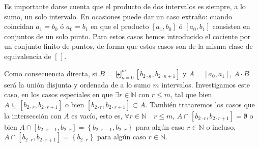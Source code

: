 \documentclass[final,12pt,a4paper,twoside,fleqn]{extbook}
\newcommand{\set}[1]{\ensuremath{\left\lbrace{#1}\right\rbrace}}
\newcommand{\setN}{\ensuremath{\mathds{N}}}
\theoremstyle{definition}
\theoremstyle{remark}
\begin{document}
	Es importante darse cuenta que el producto de dos intervalos es siempre,
a lo sumo, un solo intervalo. En ocasiones puede dar un caso extraño: cuando
coincidan \(a_1 = b_0\) ó \(a_0 = b_1\) en que el producto
\(\left[a_1,b_0\right]\) ó \(\left[a_0,b_1\right]\) consisten en conjuntos de
un solo punto. Para estos casos hemos introducido el cociente por un conjunto
finito de puntos, de forma que estos casos son de la misma clase de
equivalencia de \(\left[\,\right]\).



	Como consecuencia directa, si \(B={\biguplus}_{\kappa=0}^{m}
\left[b_{2\cdot\kappa},b_{2\cdot\kappa+1}\right]\) y
\(A=\left[a_0,a_1\right]\), \(A\cdot B\) será la unión disjunta y ordenada de
a lo sumo \(m\) intervalos. Investigamos este caso, en los casos especiales
en que \(\exists r \in \setN\) con \(r \leq m\), tal que bien \(A \subseteq
\left[b_{2\cdot r},b_{2\cdot r+1}\right]\) o bien  \(\left[b_{2\cdot
r},b_{2\cdot r+1}\right] \subset A\). También trataremos los casos que la
intersección con \(A\) es vacío, esto es, \(\forall r \in \setN\quad r \leq
m\), \(A \cap \left[b_{2\cdot r},b_{2\cdot r+1}\right] = \emptyset\) o bien
\(A \cap \left[b_{2\cdot r-1},b_{2\cdot r}\right] = \set{b_{2\cdot
r-1},b_{2\cdot r}}\) para algún caso \(r\in\setN\) o incluso, \(A \cap
\left[b_{2\cdot r},b_{2\cdot r+1}\right] = \set{b_{2\cdot r}}\) para algún
caso \(r\in\setN\).
\end{document}
